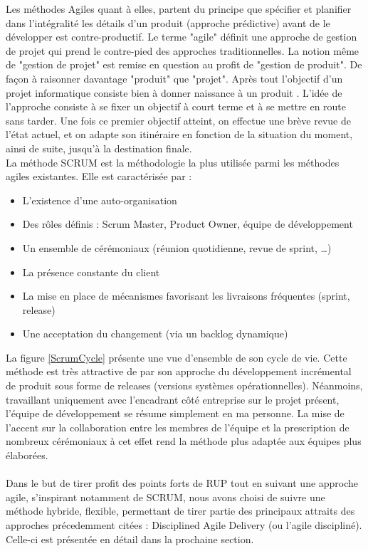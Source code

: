\begin{spacing}{1.5}
Les méthodes Agiles quant à elles, partent du principe que spécifier et planifier dans l’intégralité les détails d’un produit (approche prédictive) avant de le développer est contre-productif. Le terme "agile" définit une approche de gestion de projet qui prend le contre-pied des approches traditionnelles. La notion même de "gestion de projet" est remise en question au profit de "gestion de produit". De façon à raisonner davantage "produit" que "projet". Après tout l'objectif d'un projet informatique consiste bien à donner naissance à un produit \cite{http://www.agiliste.fr/introduction-methodes-agiles/}.  L’idée de l’approche consiste à se fixer un objectif à court terme et à se mettre en route sans tarder. Une fois ce premier objectif atteint, on effectue une brève revue de l'état actuel, et on adapte son itinéraire en fonction de la situation du moment, ainsi de suite, jusqu’à la destination finale.\\
 La méthode SCRUM est la méthodologie la plus utilisée parmi les méthodes agiles existantes. Elle est caractérisée par :
\begin{itemize}
    \item L’existence d’une auto-organisation
    \item Des rôles définis : Scrum Master, Product Owner, équipe de développement
    \item Un ensemble de cérémoniaux (réunion quotidienne, revue de sprint, …)
    \item La présence constante du client
    \item La mise en place de mécanismes favorisant les livraisons fréquentes (sprint, release)
    \item Une acceptation du changement (via un backlog dynamique)
\end{itemize}
La figure \ref{ScrumCycle} présente une vue d'ensemble de son cycle de vie. Cette méthode est très attractive de par son approche du développement incrémental de produit sous forme de releases (versions systèmes opérationnelles). Néanmoins, travaillant uniquement avec l'encadrant côté entreprise sur le projet présent, l'équipe de développement se résume simplement en ma personne. La mise de l'accent sur la collaboration entre les membres de l'équipe et la prescription de nombreux cérémoniaux à cet effet rend la méthode plus adaptée aux équipes plus élaborées.\\
\\
Dans le but de tirer profit des points forts de RUP tout en suivant une approche agile, s'inspirant notamment de SCRUM, nous avons choisi de suivre une méthode hybride, flexible, permettant de tirer partie des principaux attraits des approches précedemment citées : Disciplined Agile Delivery (ou l'agile discipliné). Celle-ci est présentée en détail dans la prochaine section.


\end{spacing}
